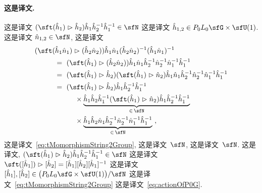 \documentclass[
    affil-it, %
    auth-lg, %
    british, %
    compression, %
    contents, %
    custom-packages={}, %
    references={bigone}, %
]{lib/preprint}
\begin{document}
\begin{body}
        \paragraph{这是译文.}
 这是译文 $(\sft(\hat h_1)\acton\hat h_2)\hat h_1\hat h_2^{-1}\hat h_1^{-1}\in\sfN$ 这是译文 $\hat h_{1,2}\in P_0L_0\sfG\times\sfU(1)$. 这是译文 $\hat n_{1,2}\in\sfN$, 这是译文 
        \begin{equation}
            \begin{aligned}
                &(\sft(\hat h_1\hat n_1)\acton(\hat h_2\hat n_2))\hat h_1\hat n_1(\hat h_2\hat n_2)^{-1}(\hat h_1\hat n_1)^{-1}
                \\
                &\kern1cm=\ (\sft(\hat h_1)\acton(\hat h_2\hat n_2))\hat h_1\hat n_1\hat h_2^{-1}\hat n_2^{-1}\hat n_1^{-1}\hat h_1^{-1} 
                \\
                &\kern1cm=\ (\sft(\hat h_1)\acton\hat h_2)(\sft(\hat h_1)\acton\hat n_2)\hat h_1\hat n_1\hat h_2^{-1}\hat n_2^{-1}\hat n_1^{-1}\hat h_1^{-1}
                \\
                &\kern1cm=\ (\sft(\hat h_1)\acton\hat h_2)\hat h_1\hat h_2^{-1}\hat h_1^{-1}
                \\
                &\kern2cm\times\underbrace{\hat h_1\hat h_2\hat h_1^{-1}(\sft(\hat h_1)\acton\hat n_2)\hat h_1\hat h_2^{-1}\hat h_1^{-1}}_{\in\,\sfN}
                \\
                &\kern2cm\times\underbrace{\hat h_1\hat h_2\hat n_1\hat h_2^{-1}\hat n_2^{-1}\hat n_1^{-1}\hat h_1^{-1}}_{\in\,\sfN}~,
            \end{aligned}
        \end{equation}  这是译文~\eqref{eq:tMomorphismString2Group}, 这是译文~$\sfN$, 这是译文~$\sfN$. 这是译文, $(\sft(\hat h_1)\acton\hat h_2)\hat h_1\hat h_2^{-1}\hat h_1^{-1}\in\sfN$ 这是译文 $\sft([\hat h_1])\acton[\hat h_2]=[\hat h_1][\hat h_2][\hat h_1]^{-1}$ 这是译文 $[\hat h_1],[\hat h_2]\in\big(P_0L_0\sfG\times\sfU(1)\big)/\sfN$ 这是译文~\eqref{eq:tMomorphismString2Group} 这是译文~\eqref{eq:actionOfP0G}. 
        

\end{body}
\end{document}
